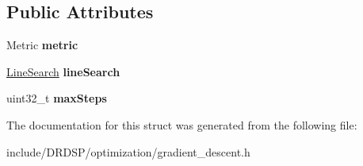\subsection*{Public Attributes}
\begin{DoxyCompactItemize}
\item 
\hypertarget{struct_d_r_d_s_p_1_1_gradient_descent_a3d83fb182690e94d667cf7e079706427}{Metric {\bfseries metric}}\label{struct_d_r_d_s_p_1_1_gradient_descent_a3d83fb182690e94d667cf7e079706427}

\item 
\hypertarget{struct_d_r_d_s_p_1_1_gradient_descent_a5da80c1f920af9fca7bbee2e4698848b}{\hyperlink{struct_d_r_d_s_p_1_1_line_search}{Line\-Search} {\bfseries line\-Search}}\label{struct_d_r_d_s_p_1_1_gradient_descent_a5da80c1f920af9fca7bbee2e4698848b}

\item 
\hypertarget{struct_d_r_d_s_p_1_1_gradient_descent_afd2cba8ba783cebeb2abd470242c4d5c}{uint32\-\_\-t {\bfseries max\-Steps}}\label{struct_d_r_d_s_p_1_1_gradient_descent_afd2cba8ba783cebeb2abd470242c4d5c}

\end{DoxyCompactItemize}


The documentation for this struct was generated from the following file\-:\begin{DoxyCompactItemize}
\item 
include/\-D\-R\-D\-S\-P/optimization/gradient\-\_\-descent.\-h\end{DoxyCompactItemize}
